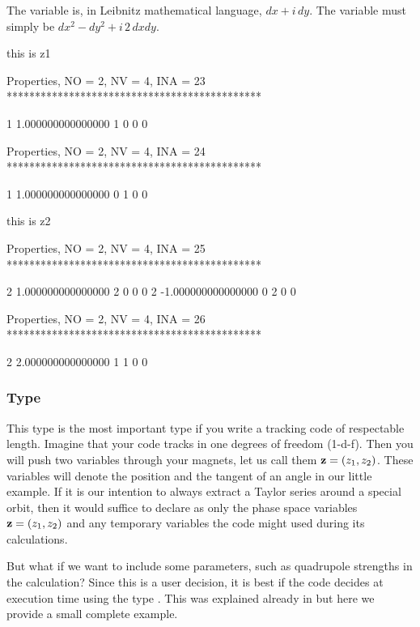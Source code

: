 \documentclass[english,12pt,article]{article} %
\begin{document}
The variable  is, in Leibnitz  mathematical  language, $dx+i \, dy$. The variable  must simply be $dx^2-dy^2+i\, 2\, dx dy$.
\begin{example1}
  this is z1

 Properties, NO =    2, NV =    4, INA =   23
 *********************************************

   1   1.000000000000000       1  0  0  0


 Properties, NO =    2, NV =    4, INA =   24
 *********************************************

   1   1.000000000000000       0  1  0  0

  this is z2

 Properties, NO =    2, NV =    4, INA =   25
 *********************************************

   2   1.000000000000000       2  0  0  0
   2  -1.000000000000000       0  2  0  0


 Properties, NO =    2, NV =    4, INA =   26
 *********************************************

   2   2.000000000000000       1  1  0  0
\end{example1}

 \subsubsection{Type \protect{}}  \label{sec:real8code}


This type is the most important type if you write a tracking code of respectable length.  Imagine that your code tracks in one degrees of freedom (1-d-f). Then you will push two variables through your magnets, let us call them ${\bf z}=(z_1,z_2)$. These variables will denote  the position and the tangent of an angle in our little example.  If it is our  intention to always extract a Taylor series around a special orbit, then  it would suffice to declare as  only the phase space variables ${\bf z}=(z_1,z_2)$ and any temporary variables the code might used during its calculations. 

But what if we want to include some parameters, such as quadrupole strengths in the calculation? Since this is a user decision, it is best if the code decides at execution time using the type  .  This was explained already  in  but here we provide a small complete example.
\end{document}
